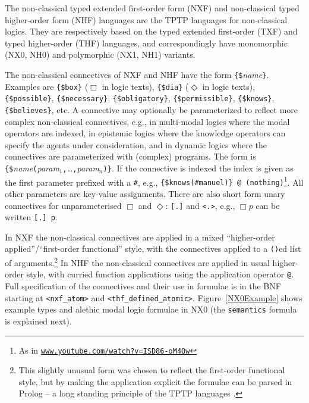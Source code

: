 \documentclass[runningheads]{llncs}
\begin{document}
The non-classical typed extended first-order form (NXF) and non-classical typed higher-order 
form (NHF) languages are the TPTP languages for non-classical logics.
They are respectively based on the typed extended first-order (TXF) and typed higher-order (THF)
languages, and correspondingly have mono\-morphic (NX0, NH0) and polymorphic (NX1, NH1) variants.

The non-classical connectives of NXF and NHF have the form {\tt \{\$}{\em name}{\tt \}}.
Examples are {\tt \{\$box\}} ($\Box$ in logic texts), {\tt \{\$dia\}} ($\Diamond$ in logic texts), 
{\tt \{\$possible\}}, {\tt \{\$necessary\}}, {\tt \{\$obligatory\}}, {\tt \{\$permissible\}}, 
{\tt \{\$knows\}}, {\tt \{\$believes\}}, etc.
A connective may optionally be parameterized to reflect more complex non-classical connectives,
e.g., in multi-modal logics where the modal operators are indexed, in epistemic logics
where the knowledge operators can specify the agents under consideration,
and in dynamic logics \cite{HKT00} where the connectives are parameterized with (complex) programs.
The form is
{\tt \verb|{|\$}{\em name}{\tt (}{\em param$_1$}{\tt ,}{\em \ldots}{\tt ,}{\em param$_n$}{\tt )}{\tt \verb|}|}.
If the connective is indexed the index is given as the first parameter prefixed with a {\tt \#},
e.g., {\tt \{\$knows(\#manuel)\} @ (nothing)}\footnote{%
As in \href{https://www.youtube.com/watch?v=ISD86-oM4Ow}{\tt www.youtube.com/watch?v=ISD86-oM4Ow}}.
All other parameters are key-value assignments.
There are also short form unary connectives for unparameterised $\Box$ and $\Diamond$: {\tt [.]} 
and {\tt <.>}, e.g., $\Box p$ can be written {\tt [.] p}.

In NXF the non-classical connectives are applied in a mixed 
``higher-order applied''/``first-order functional'' style, with the connectives applied to a
{\tt ()}ed list of arguments.\footnote{%
This slightly unusual form was chosen to reflect the first-order functional style, but by making
the application explicit the formulae can be parsed in Prolog -- a long standing principle of the
TPTP languages \cite{SZS04}.}
In NHF the non-classical connectives are applied in usual higher-order style, with curried 
function applications using the application operator {\tt @}.
Full specification of the connectives and their use in formulae is in the 
BNF
starting at {\tt <nxf\_atom>} and {\tt <thf\_defined\_atomic>}.
Figure~\ref{NX0Example} shows example types and alethic modal logic formulae in NX0 (the
{\tt semantics} formula is explained next).
\end{document}
